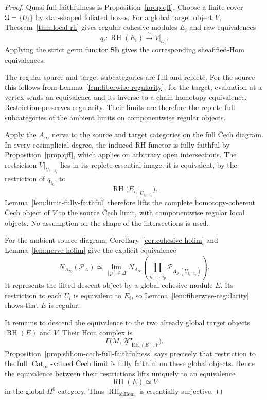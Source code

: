 \documentclass[12pt]{amsart}
\theoremstyle{definition}
\theoremstyle{remark}
\numberwithin{equation}{section}
\newcommand{\CF}{{\mathcal F}}
\newcommand{\A}{{A}}
\newcommand{\1}{{\mathbb{1}}}
\newcommand{\RH}{\operatorname{RH}}
\begin{document}
\begin{proof}
Quasi-full faithfulness is Proposition~\ref{prop:qff}.  Choose a
finite cover $\mathfrak U=\{U_i\}$ by star-shaped foliated boxes.
For a global target object $V$, Theorem~\ref{thm:local-rh} gives
regular cohesive modules $E_i$ and raw equivalences
\[
 q_i:\RH(E_i)\xrightarrow{\;\sim\;}V|_{U_i}.
\]
Applying the strict germ functor $\mathbf{Sh}$ gives the corresponding
sheafified-Hom equivalences.

The regular source and target subcategories are full and replete.
For the source this follows from
Lemma~\ref{lem:fiberwise-regularity}; for the target, evaluation at a
vertex sends an equivalence and its inverse to a chain-homotopy
equivalence.  Restriction preserves regularity.  Their limits are
therefore the replete full subcategories of the ambient limits on
componentwise regular objects.

Apply the $A_\infty$ nerve to the source and target categories on the
full \v{C}ech diagram.  In every cosimplicial degree, the induced RH
functor is fully faithful by Proposition~\ref{prop:qff}, which applies
on arbitrary open intersections.  The restriction
$V|_{U_{i_0\ldots i_p}}$ lies in its replete essential image: it is
equivalent, by the restriction of $q_{i_0}$, to
\[
 \RH\bigl(E_{i_0}|_{U_{i_0\ldots i_p}}\bigr).
\]
Lemma~\ref{lem:limit-fully-faithful} therefore lifts the complete
homotopy-coherent \v{C}ech object of $V$ to the source \v{C}ech
limit, with componentwise regular local objects.  No assumption on the
shape of the intersections is used.

For the ambient source diagram,
Corollary~\ref{cor:cohesive-holim} and
Lemma~\ref{lem:nerve-holim} give the explicit equivalence
\[
 N_{A_\infty}(\mathcal P_{\A})
 \simeq
 \lim_{[p]\in\Delta}
 N_{A_\infty}\left(
  \prod_{i_0,\ldots,i_p}
  \mathcal P_{\A_{\CF}(U_{i_0\ldots i_p})}
 \right).
\]
It represents the lifted descent object by a global cohesive module
$E$.  Its restriction to each $U_i$ is equivalent to $E_i$, so
Lemma~\ref{lem:fiberwise-regularity} shows that $E$ is regular.

It remains to descend the equivalence to the two already global target
objects $\RH(E)$ and $V$.  Their Hom complex is
\[
 \Gamma\bigl(
 M,\underline{\mathcal H}^\bullet_{\RH(E),V}
 \bigr).
\]
Proposition~\ref{prop:shhom-cech-full-faithfulness} says precisely
that restriction to the full $\operatorname{Cat}_\infty$-valued
\v{C}ech limit is fully faithful on these global objects.  Hence the
equivalence between their restrictions lifts uniquely to an equivalence
\[
 \RH(E)\simeq V
\]
in the global $H^0$-category.  Thus $\RH_{\mathrm{shHom}}$ is
essentially surjective.
\end{proof}
\end{document}
